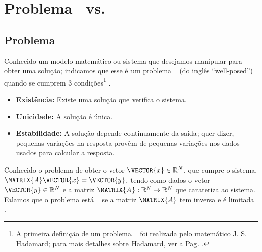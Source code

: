 \section{Problema \wellposed~vs. \illposed }

\subsection{Problema \wellposed}
\begin{definition}
\label{def:bem-posto:1}
Conhecido um modelo matemático ou sistema que desejamos manipular para obter uma solução;
indicamos que esse é um problema \wellposed~ (do inglês ``well-posed'') 
quando se cumprem 3 condições\footnote{A primeira definição de um problema \wellposed~ 
foi realizada pelo matemático J. S. Hadamard; 
para mais detalhes sobre Hadamard, ver a Pag. \pageref{elab:Hadamard}.} \cite[pp. 16]{gockenbach2016linear}
\cite[pp. 6]{p2011well}.
\begin{itemize}
\item \textbf{Existência:} Existe uma solução que verifica o sistema.
\item \textbf{Unicidade:} A solução é única.
\item \textbf{Estabilidade:} A solução depende continuamente da saída;
quer dizer, pequenas variações na resposta provêm de pequenas variações nos dados usados para calcular a resposta.
\end{itemize}
\end{definition}

\begin{example}
Conhecido o problema de obter o vetor $\VECTOR{x} \in \mathbb{R}^{N}$,
que cumpre o sistema, $\MATRIX{A}\VECTOR{x}=\VECTOR{y}$,
 tendo como dados o vetor $\VECTOR{y} \in \mathbb{R}^{N}$ e 
a matriz $\MATRIX{A}: \mathbb{R}^{N} \rightarrow \mathbb{R}^{N}$ que carateriza ao sistema.
Falamos que o problema está \wellposed~ se a matriz $\MATRIX{A}$ 
tem inversa e é limitada \cite[pp. 18]{gockenbach2016linear}. 
\end{example}

